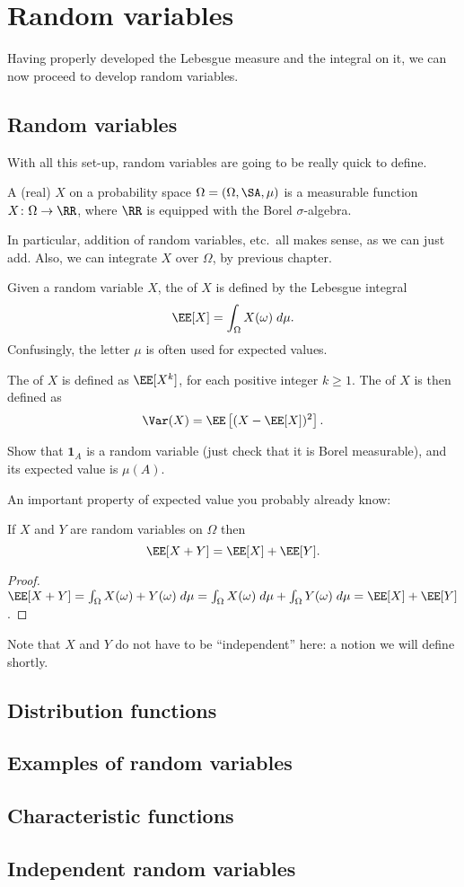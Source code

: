 \chapter{Random variables}
Having properly developed the Lebesgue measure
and the integral on it,
we can now proceed to develop random variables.

\section{Random variables}
With all this set-up, random variables are going to be really quick to define.
\begin{definition}
	A (real)  $X$ on a probability space
	$\Omega = (\Omega, \SA, \mu)$
	is a measurable function $X \colon \Omega \to \RR$,
	where $\RR$ is equipped with the Borel $\sigma$-algebra.
\end{definition}
In particular, addition of random variables, etc.\
all makes sense, as we can just add.
Also, we can integrate $X$ over $\Omega$, by previous chapter.

\begin{definition}
	Given a random variable $X$,
	the  of $X$ is defined by
	the Lebesgue integral
	\[ \EE[X] = \int_{\Omega} X(\omega) \; d\mu. \]
	Confusingly, the letter $\mu$ is often used for expected values.

	The  of $X$ is defined as $\EE[X^k]$,
	for each positive integer $k \ge 1$.
	The  of $X$ is then defined as
	\[ \Var(X) = \EE\left[ (X-\EE[X])^2 \right]. \]
\end{definition}
\begin{ques}
	Show that $\mathbf{1}_A$ is a random variable
	(just check that it is Borel measurable),
	and its expected value is $\mu(A)$.
\end{ques}

An important property of expected value you probably already know:
\begin{theorem}
	If $X$ and $Y$ are random variables on $\Omega$ then
	\[ \EE[X+Y] = \EE[X] + \EE[Y]. \]
\end{theorem}
\begin{proof}
	$\EE[X+Y] = \int_\Omega X(\omega) + Y(\omega) \; d\mu
	= \int_\Omega X(\omega) \; d\mu + \int_\Omega Y(\omega) \; d\mu
	= \EE[X] + \EE[Y]$.
\end{proof}
Note that $X$ and $Y$ do not have to be ``independent'' here:
a notion we will define shortly.

\section{Distribution functions}

\section{Examples of random variables}

\section{Characteristic functions}

\section{Independent random variables}

